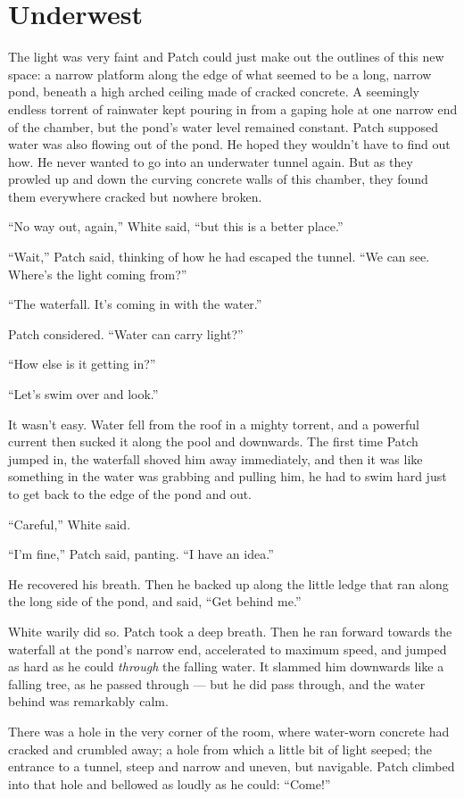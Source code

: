 \documentclass[ebook,oneside,openany,12pt]{memoir}
\begin{document}

\section{Underwest}

The light was very faint and Patch could just make out the outlines of
this new space: a narrow platform along the edge of what seemed to be
a long, narrow pond, beneath a high arched ceiling made of cracked
concrete. A seemingly endless torrent of rainwater kept pouring in
from a gaping hole at one narrow end of the chamber, but the pond’s
water level remained constant. Patch supposed water was also flowing
out of the pond. He hoped they wouldn’t have to find out how. He never
wanted to go into an underwater tunnel again. But as they prowled up
and down the curving concrete walls of this chamber, they found them
everywhere cracked but nowhere broken.

“No way out, again,” White said, “but this is a better place.”

“Wait,” Patch said, thinking of how he had escaped the tunnel. “We can
see. Where’s the light coming from?”

“The waterfall. It’s coming in with the water.”

Patch considered. “Water can carry light?”

“How else is it getting in?”

“Let’s swim over and look.”

It wasn’t easy. Water fell from the roof in a mighty torrent, and a
powerful current then sucked it along the pool and downwards. The
first time Patch jumped in, the waterfall shoved him away immediately,
and then it was like something in the water was grabbing and pulling
him, he had to swim hard just to get back to the edge of the pond and
out.

“Careful,” White said.

“I’m fine,” Patch said, panting. “I have an idea.”

He recovered his breath. Then he backed up along the little ledge that
ran along the long side of the pond, and said, “Get behind me.”

White warily did so. Patch took a deep breath. Then he ran forward
towards the waterfall at the pond’s narrow end, accelerated to maximum
speed, and jumped as hard as he could \emph{through }the falling
water. It slammed him downwards like a falling tree, as he passed
through — but he did pass through, and the water behind was remarkably
calm.

There was a hole in the very corner of the room, where water-worn
concrete had cracked and crumbled away; a hole from which a little bit
of light seeped; the entrance to a tunnel, steep and narrow and
uneven, but navigable. Patch climbed into that hole and bellowed as
loudly as he could: “Come!”
\end{document}
